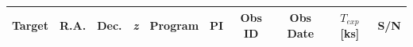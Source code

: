 \documentclass[iop]{emulateapj-rtx4}
\begin{document}

\begin{table}[ht]\footnotesize
\begin{center}
\begin{tabular}{l c c c c c c c c c}
 \hline \hline
  Target & R.A. & Dec. & \textit{z} & Program & PI & Obs ID & Obs Date & $T_{exp}$ [ks] & S/N  \\ \hline
   

\end{tabular}
\end{center}
\end{table}
\end{document}
